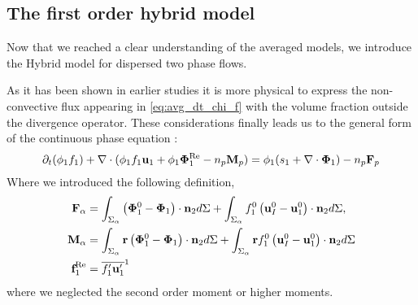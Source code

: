 \subsection{The first order hybrid model}

Now that we reached a clear understanding of the averaged models, we introduce the Hybrid model for dispersed two phase flows. 

As it has been shown in earlier studies \citep{jackson2000dynamics,chu2016flux} it is more physical to express the non-convective flux appearing in \ref{eq:avg_dt_chi_f} with the volume fraction outside the divergence operator. 
These considerations finally leads us to the general form of the continuous phase equation : 
\begin{equation}
    \partial_t (\phi_1 f_1)
    + \mathbf{\nabla}\cdot (\phi_1 f_1\textbf{u}_1
    + \phi_1 \bm{\Phi}^\text{Re}_1
    - n_p \textbf{M}_p )
    = 
    \phi_1(s_1  +\mathbf{\nabla}\cdot \mathbf{\Phi}_1)
    - n_p \textbf{F}_p
    \label{eq:hybrid_avg_dt_chif}
\end{equation}
Where we introduced the following definition, 
\begin{align*}
    \textbf{F}_\alpha 
    &= 
    \int_{\Sigma_\alpha}
    \left(
        \mathbf{\Phi}_1^0 
        - \mathbf{\Phi}_1
    \right)  
    \cdot \textbf{n}_2d\Sigma
    + 
    \int_{\Sigma_\alpha}f_1^0
    \left(
        \textbf{u}_I^0
        - \textbf{u}_1^0
    \right)
    \cdot \textbf{n}_2d\Sigma,\\
    \textbf{M}_\alpha 
    &= \int_{\Sigma_\alpha} \textbf{r}
        \left(\mathbf{\Phi}_1^0- \mathbf{\Phi}_1\right)\cdot \textbf{n}_2d\Sigma
        + \int_{\Sigma_\alpha} \textbf{r}f_1^0
        \left(
            \textbf{u}_I^0
            - \textbf{u}_1^0
        \right)
    \cdot \textbf{n}_2d\Sigma\\
    \textbf{f}^\text{Re}_1
    &= \overline{f_1' \textbf{u}_1'}^1 
\end{align*}
where we neglected the second order moment or higher moments. 

